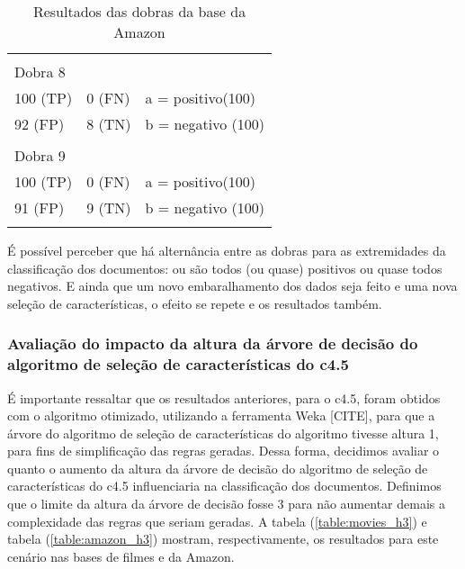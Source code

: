 \begin{table}[!h]
\begin{tabular}{lll}
	&&\\
	Dobra 8    \\
    100 (TP)    				&0 (FN)      				& a = positivo(100) \\ 
    92 (FP)    				&8 (TN)      				& b = negativo (100) \\
	&&\\
	Dobra 9    \\
    100 (TP)    				&0 (FN)      				& a = positivo(100) \\ 
    91 (FP)    				&9 (TN)      				& b = negativo (100) \\
	&&\\
    \end{tabular}
    \caption{Resultados das dobras da base da Amazon}
	\label{table:amazon_folds}
\end{table}

É possível perceber que há alternância entre as dobras para as extremidades da classificação dos documentos: ou são todos (ou quase) positivos ou quase todos negativos. E ainda que um novo embaralhamento dos dados seja feito e uma nova seleção de características, o efeito se repete e os resultados também. 

\subsubsection{Avaliação do impacto da altura da árvore de decisão do algoritmo de seleção de características do c4.5}

É importante ressaltar que os resultados anteriores, para o c4.5, foram obtidos com o algoritmo otimizado, utilizando a ferramenta Weka [CITE], para que a árvore do algoritmo de seleção de características do algoritmo tivesse altura 1, para fins de simplificação das regras geradas. Dessa forma, decidimos avaliar o quanto o aumento da altura da árvore de decisão do algoritmo de seleção de características do c4.5 influenciaria na classificação dos documentos. Definimos que o limite da altura da árvore de decisão fosse 3 para não aumentar demais a complexidade das regras que seriam geradas. A tabela (\ref{table:movies_h3}) e tabela (\ref{table:amazon_h3}) mostram, respectivamente, os resultados para este cenário nas bases de filmes e da Amazon.

